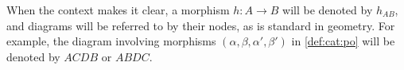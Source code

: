 \begin{notation}
    When the context makes it clear, a morphism \( h : A \to B \) will be denoted by \( h_{AB} \), and diagrams will be referred to by their nodes, as is standard in geometry. For example, the diagram involving morphisms \( ( \alpha, \beta, \alpha', \beta' ) \) in \autoref{def:cat:po} will be denoted by \( ACDB \) or \( ABDC \).
\end{notation}   

